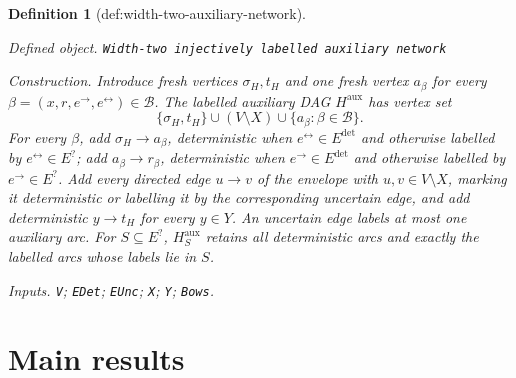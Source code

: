 \documentclass{article}
\newtheorem{definition}{Definition}
\begin{document}
\begin{definition}[def:width-two-auxiliary-network]\label{def:width-two-auxiliary-network}
\par\smallskip\noindent\emph{Defined object.} \texttt{Width-\allowbreak{}two injectively labelled auxiliary network}
\par\smallskip\noindent\emph{Construction.} Introduce fresh vertices \(\sigma_H,t_H\) and one fresh vertex \(a_\beta\) for every \(\beta=(x,r,e^{\to},e^{\leftrightarrow})\in\mathcal B\).  The labelled auxiliary DAG \(H^{\mathrm{aux}}\) has vertex set
\[
 \{\sigma_H,t_H\}\cup(V\setminus X)\cup\{a_\beta:\beta\in\mathcal B\}.
\]
For every \(\beta\), add \(\sigma_H\to a_\beta\), deterministic when \(e^{\leftrightarrow}\in E^{\mathrm{det}}\) and otherwise labelled by \(e^{\leftrightarrow}\in E^{?}\); add \(a_\beta\to r_\beta\), deterministic when \(e^{\to}\in E^{\mathrm{det}}\) and otherwise labelled by \(e^{\to}\in E^{?}\).  Add every directed edge \(u\to v\) of the envelope with \(u,v\in V\setminus X\), marking it deterministic or labelling it by the corresponding uncertain edge, and add deterministic \(y\to t_H\) for every \(y\in Y\).  An uncertain edge labels at most one auxiliary arc.  For \(S\subseteq E^{?}\), \(H^{\mathrm{aux}}_S\) retains all deterministic arcs and exactly the labelled arcs whose labels lie in \(S\).
\par\smallskip\noindent\emph{Inputs.} \texttt{V}; \texttt{EDet}; \texttt{EUnc}; \texttt{X}; \texttt{Y}; \texttt{Bows}.
\end{definition}

\section{Main results}
\end{document}
